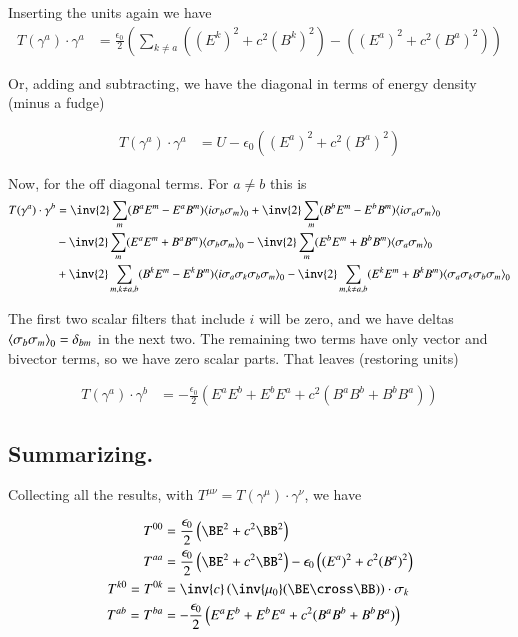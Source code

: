 Inserting the units again we have
\begin{align}
T(\gamma^a) \cdot \gamma^a 
&= 
\frac{\epsilon_0}{2} \left( \sum_{k \ne a} \left( (E^k)^2 + c^2 (B^k)^2 \right) - \left( (E^a)^2  + c^2 (B^a)^2  \right) \right)
\end{align}

Or, adding and subtracting, we have the diagonal in terms of energy density (minus a fudge) 

\begin{align}
T(\gamma^a) \cdot \gamma^a &= U - \epsilon_0 \left( (E^a)^2  + c^2 (B^a)^2  \right)
\end{align}

Now, for the off diagonal terms.  For $a \ne b$ this is
\begin{align*}
T(\gamma^a) \cdot \gamma^b 
&= 
\inv{2} \sum_m (B^a E^m - E^a B^m) \gpgradezero{ i \sigma_b \sigma_m } 
+\inv{2} \sum_{m}(B^b E^m - E^b B^m) \gpgradezero{ i \sigma_a \sigma_m } \\
&- \inv{2} \sum_m (E^a E^m + B^a B^m) \gpgradezero{ \sigma_b \sigma_m } 
- \inv{2} \sum_{m}(E^b E^m + B^b B^m) \gpgradezero{ \sigma_a \sigma_m } \\
&+\inv{2} \sum_{m, k \ne a,b}(B^k E^m - E^k B^m) \gpgradezero{ i \sigma_a \sigma_k \sigma_b \sigma_m } 
- \inv{2} \sum_{m, k \ne a,b}(E^k E^m + B^k B^m) \gpgradezero{ \sigma_a \sigma_k \sigma_b \sigma_m } \\
\end{align*}

The first two scalar filters that include $i$ will be zero, and we have deltas
${\left\langle{{ \sigma_b \sigma_m }}\right\rangle}_{0} = \delta_{bm}$ in the next two.
The remaining two terms have only vector and bivector terms, so we have zero scalar parts.
That leaves (restoring units)

\begin{align}
T(\gamma^a) \cdot \gamma^b 
&= - \frac{\epsilon_0}{2} \left( E^a E^b + E^b E^a + c^2 (B^a B^b + B^b B^a) \right)
\end{align}

\subsection{Summarizing. }

Collecting all the results, with $T^{\mu\nu} = T(\gamma^\mu) \cdot \gamma^\nu$, we have

\begin{align}
T^{00} &= \frac{\epsilon_0}{2} \left(\BE^2 + c^2 \BB^2\right) \\
T^{aa} &= \frac{\epsilon_0}{2} \left(\BE^2 + c^2 \BB^2\right) - \epsilon_0 \left( (E^a)^2  + c^2 (B^a)^2  \right) \\
T^{k0} = T^{0k} &= \inv{c} \left( \inv{\mu_0}(\BE \cross \BB) \right) \cdot \sigma_k \\
T^{ab} = T^{ba} &= - \frac{\epsilon_0}{2} \left( E^a E^b + E^b E^a + c^2 (B^a B^b + B^b B^a) \right)
\end{align}

